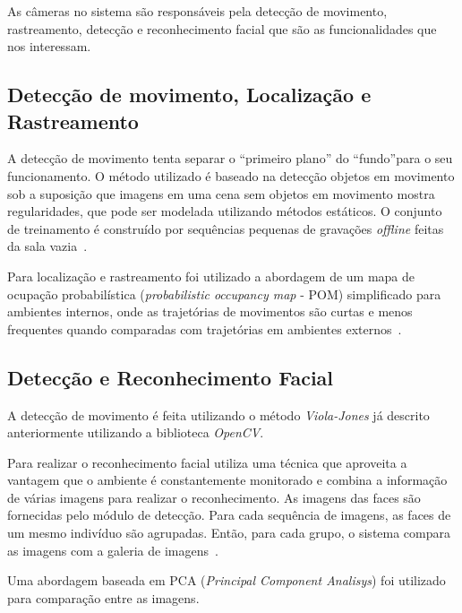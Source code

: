 As câmeras no sistema são responsáveis pela detecção de movimento, rastreamento, detecção e reconhecimento facial que são as funcionalidades que nos interessam.

\subsection{Detecção de movimento, Localização e Rastreamento}

A detecção de movimento tenta separar o ``primeiro plano'' do ``fundo''para o seu funcionamento. O método utilizado é baseado na detecção objetos em movimento sob a suposição que imagens em uma cena sem objetos em movimento mostra regularidades, que pode ser modelada utilizando métodos estáticos. O conjunto de treinamento é construído por sequências pequenas de gravações \textit{offline} feitas da sala vazia~\cite{salah}.

Para localização e rastreamento foi utilizado a abordagem de um mapa de ocupação probabilística (\textit{probabilistic occupancy map} - POM) simplificado para ambientes internos, onde as trajetórias de movimentos são curtas e menos frequentes quando comparadas com trajetórias em ambientes externos~\cite{salah}.

\subsection{Detecção e Reconhecimento Facial}

A detecção de movimento é feita utilizando o método \textit{Viola-Jones} já descrito anteriormente utilizando a biblioteca \textit{OpenCV}. 

Para realizar o reconhecimento facial utiliza uma técnica que aproveita a vantagem que o ambiente é constantemente monitorado e combina a informação de várias imagens para realizar o reconhecimento. As imagens das faces são fornecidas pelo módulo de detecção.
Para cada sequência de imagens, as faces de um mesmo indivíduo são agrupadas. Então, para cada grupo, o sistema compara as imagens com a galeria de imagens~\cite{salah}. 

Uma abordagem baseada em PCA (\textit{Principal Component Analisys}) foi utilizado para comparação entre as imagens.


